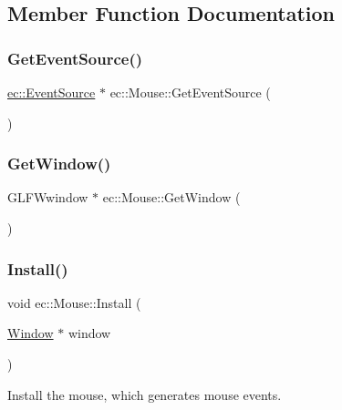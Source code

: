 \subsection{Member Function Documentation}
\mbox{\label{classec_1_1_mouse_afe0858cb6822eb8bd996584c28c5b1dc}} 
\subsubsection{\texorpdfstring{Get\+Event\+Source()}{GetEventSource()}}
{\footnotesize\ttfamily \mbox{\hyperlink{classec_1_1_event_source}{ec\+::\+Event\+Source}} $\ast$ ec\+::\+Mouse\+::\+Get\+Event\+Source (\begin{DoxyParamCaption}{ }\end{DoxyParamCaption})}

\mbox{\label{classec_1_1_mouse_a85326de310aa289dd72c075bef933aa9}} 
\subsubsection{\texorpdfstring{Get\+Window()}{GetWindow()}}
{\footnotesize\ttfamily G\+L\+F\+Wwindow $\ast$ ec\+::\+Mouse\+::\+Get\+Window (\begin{DoxyParamCaption}{ }\end{DoxyParamCaption})}

\mbox{\label{classec_1_1_mouse_adcaab7abcc1f1c27036949200b75a57a}} 
\subsubsection{\texorpdfstring{Install()}{Install()}}
{\footnotesize\ttfamily void ec\+::\+Mouse\+::\+Install (\begin{DoxyParamCaption}\item[{\mbox{\hyperlink{classec_1_1_window}{Window}} $\ast$}]{window }\end{DoxyParamCaption})}

Install the mouse, which generates mouse events. \mbox{\label{classec_1_1_mouse_afa7fa66642de310a6395c0653ec3f8ac}} 
